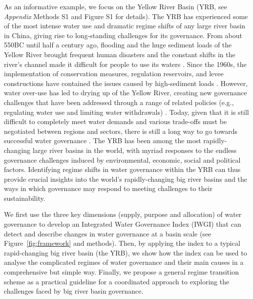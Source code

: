 As an informative example, we focus on the Yellow River Basin (YRB, see \textit{Appendix} Methods S1 and Figure S1 for details). 
The YRB has experienced some of the most intense water use and dramatic regime shifts of any large river basin in China, giving rise to long-standing challenges for its governance.
From about 550BC until half a century ago, flooding and the huge sediment loads of the Yellow River brought frequent human disasters and the constant shifts in the river’s channel made it difficult for people to use its waters 
\cite{wangReducedsedimenttransport2016,liDecadalwaterstorage2020}. 
Since the 1960s, the implementation of conservation measures, regulation reservoirs, and levee constructions have contained the issues caused by high-sediment loads 
\cite{wangReducedsedimenttransport2016,wuEvolutioneffectssocialecological2020}. 
However, water over-use has led to drying up of the Yellow River, creating new governance challenges that have been addressed through a range of related policies (e.g., regulating water use and limiting water withdrawals) 
\cite{xiaDevelopmentWaterAllocation2012}. 
Today, given that it is still difficult to completely meet water demands and various trade-offs must be negotiated between regions and sectors, there is still a long way to go towards successful water governance 
\cite{wangYellowRiverwater2019,wohlfartSocialecologicalchallengesYellow2016}. 
The YRB has been among the most rapidly-changing large river basins in the world, with myriad responses to the endless governance challenges induced by environmental, economic, social and political factors. Identifying regime shifts in water governance within the YRB can thus provide crucial insights into the world’s rapidly-changing big river basins and the ways in which governance may respond to meeting challenges to their sustainability. 

We first use the three key dimensions (supply, purpose and allocation) of water governance to develop an Integrated Water Governance Index (IWGI) that can detect and describe changes in water governance at a basin scale (see Figure~\ref{fig:framework} and methods).
Then, by applying the index to a typical rapid-changing big river basin (the YRB), we show how the index can be used to analyse the complicated regimes of water governance and their main causes in a comprehensive but simple way. 
Finally, we propose a general regime transition scheme as a practical guideline for a coordinated approach to exploring the challenges faced by big river basin governance. 

